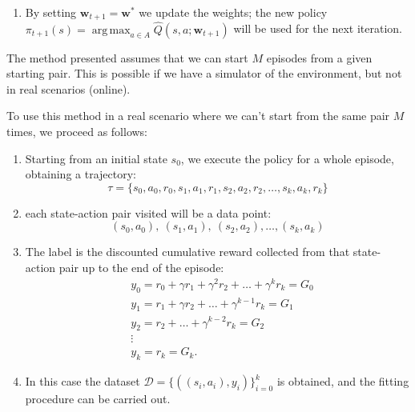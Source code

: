 \documentclass[10pt, a4paper]{report}
\begin{document}
\begin{enumerate}
\begin{itemize}
        \begin{equation}
            \mathbf{w}^* = \left( \sum_{i=1}^N \boldsymbol{\phi}(s_i, a_i)\boldsymbol{\phi}(s_i, a_i)^\top \right)^{-1} \sum_{i=1}^N \boldsymbol{\phi}(s_i, a_i) y_i
        \end{equation}
        \item If $\hat Q$ is a nonlinear model (such as a neural network) we update the weights iteratively via gradient descent for several epochs on the collected dataset $\mathcal{D}$:
        \begin{equation}
            \mathbf{w} \leftarrow \mathbf{w} + \alpha \Big[ y_i - \hat{Q}(s_i, a_i; \mathbf{w}) \Big] \nabla_{\mathbf{w}} \hat{Q}(s_i, a_i; \mathbf{w})
        \end{equation}
        with $\alpha$ a positive step size. This update is repeated until convergence.
    \end{itemize}
    \item By setting $\mathbf w_{t+1}=\mathbf w^*$ we update the weights; the new policy $\pi_{t+1}(s)=\operatorname*{arg\,max}_{a\in A}\hat Q(s,a; \mathbf w_{t+1})$ will be used for the next iteration.
\end{enumerate}
\begin{boxobservation}{}{}
    The method presented assumes that we can start $M$ episodes from a given starting pair. This is possible if we have a simulator of the environment, but not in real scenarios (online).
\end{boxobservation}
To use this method in a real scenario where we can't start from the same pair $M$ times, we proceed as follows:
\begin{enumerate}
    \item Starting from an initial state $s_0$, we execute the policy for a whole episode, obtaining a trajectory:
    \begin{equation}
        \tau=\{s_0,a_0,r_{0},s_{1},a_{1},r_{1},
        s_{2},a_{2},r_{2},\dots,s_{k},a_{k},r_{k}\}
    \end{equation}
    \item each state-action pair visited will be a data point:
    \begin{equation}
        (s_0,a_0), \ (s_1,a_1), \ (s_2,a_2),\dots,(s_k,a_k)
    \end{equation}
    \item The label is the discounted cumulative reward collected from that state-action pair up to the end of the episode:
    \begin{align}
        &y_0= r_0+\gamma r_1+\gamma^2 r_2+\dots + \gamma^k r_k = G_0\\
        &y_1= r_1+\gamma r_2+\dots + \gamma^{k-1} r_k= G_1\\
        &y_2= r_2+\dots + \gamma^{k-2} r_k= G_2\\
        &\vdots \\ &y_k=r_k= G_k.
    \end{align}
    \item In this case the dataset $\mathcal D = \{((s_i,a_i),y_i)\}_{i=0}^k$ is obtained, and the fitting procedure can be carried out.
\end{enumerate}
\end{document}
